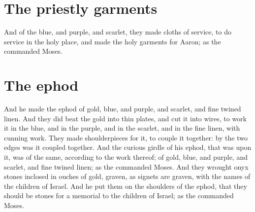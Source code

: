 \section*{The priestly garments}
\begin{biblechapter} %
\verse And of the blue, and purple, and scarlet, they made cloths of service, to do service in the holy place, and made the holy garments for Aaron; as the \LORD commanded Moses.
\section*{The ephod}
\verse And he made the ephod of gold, blue, and purple, and scarlet, and fine twined linen.
\verse And they did beat the gold into thin plates, and cut it into wires, to work it in the blue, and in the purple, and in the scarlet, and in the fine linen, with cunning work.
\verse They made shoulderpieces for it, to couple it together: by the two edges was it coupled together.
\verse And the curious girdle of his ephod, that was upon it, was of the same, according to the work thereof; of gold, blue, and purple, and scarlet, and fine twined linen; as the \LORD commanded Moses.
\verse And they wrought onyx stones inclosed in ouches of gold, graven, as signets are graven, with the names of the children of Israel.
\verse And he put them on the shoulders of the ephod, that they should be stones for a memorial to the children of Israel; as the \LORD commanded Moses.

\end{biblechapter}
